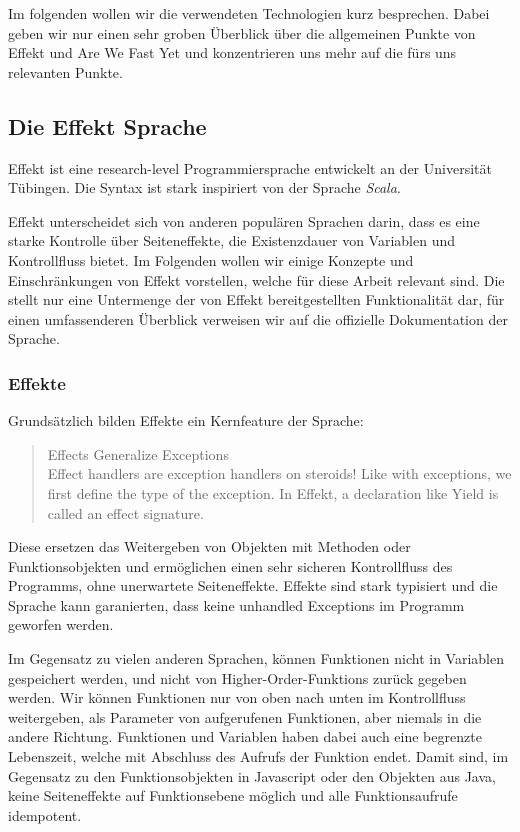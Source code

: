 Im folgenden wollen wir die verwendeten Technologien kurz besprechen.
Dabei geben wir nur einen sehr groben Überblick über die allgemeinen Punkte von Effekt und Are We Fast Yet und konzentrieren uns mehr auf die fürs uns relevanten Punkte.

\subsection{ Die Effekt Sprache  }	
Effekt ist eine research-level Programmiersprache entwickelt an der Universität Tübingen.
Die Syntax ist stark inspiriert von der Sprache \textit{Scala}.

Effekt unterscheidet sich von anderen populären Sprachen darin, dass es eine starke Kontrolle über Seiteneffekte, die Existenzdauer von Variablen und Kontrollfluss bietet.
Im Folgenden wollen wir einige Konzepte und Einschränkungen von Effekt vorstellen, welche für diese Arbeit relevant sind. Die stellt nur eine Untermenge der von Effekt bereitgestellten Funktionalität dar, für einen umfassenderen Überblick verweisen wir auf die offizielle Dokumentation der Sprache.

\subsubsection{ Effekte }

Grundsätzlich bilden Effekte ein Kernfeature der Sprache:
\begin{quote}
    Effects Generalize Exceptions\\
    Effect handlers are exception handlers on steroids! Like with exceptions, we first define the type of the exception. In Effekt, a declaration like Yield is called an effect signature.
\end{quote}

Diese ersetzen das Weitergeben von Objekten mit Methoden oder Funktionsobjekten und ermöglichen einen sehr sicheren Kontrollfluss des Programms, ohne unerwartete Seiteneffekte.
Effekte sind stark typisiert und die Sprache kann garanierten, dass keine unhandled Exceptions im Programm geworfen werden.

Im Gegensatz zu vielen anderen Sprachen, können Funktionen nicht in Variablen gespeichert werden, und nicht von Higher-Order-Funktions zurück gegeben werden. Wir können Funktionen nur von oben nach unten im Kontrollfluss weitergeben, als Parameter von aufgerufenen Funktionen, aber niemals in die andere Richtung. Funktionen und Variablen haben dabei auch eine begrenzte Lebenszeit, welche mit Abschluss des Aufrufs der Funktion endet.
Damit sind, im Gegensatz zu den Funktionsobjekten in Javascript oder den Objekten aus Java, keine Seiteneffekte auf Funktionsebene möglich und alle Funktionsaufrufe idempotent.


